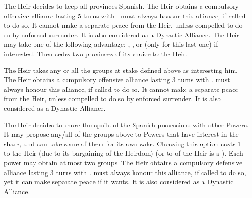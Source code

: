 \begin{digressions}
  \bgroup{}


  \aparag The Heir decides to keep all provinces Spanish.
  \aparag The Heir obtains a compulsory offensive alliance lasting 5 turns
  with \SPA. \SPA must always honour this alliance, if called to do so. It
  cannot make a separate peace from the Heir, unless compelled to do so by
  enforced surrender. It is also considered as a Dynastic Alliance.
  \aparag The Heir may take one of the following advantage: , ,  or  (\AUS only for this last one) if
  interested.
  \aparag Then \SPA cedes two provinces of its choice to the Heir.


  \aparag The Heir takes any or all the groups at stake defined above as
  interesting him.
  \aparag The Heir obtains a compulsory offensive alliance lasting 3 turns
  with \SPA. \SPA must always honour this alliance, if called to do so. It
  cannot make a separate peace from the Heir, unless compelled to do so by
  enforced surrender. It is also considered as a Dynastic Alliance.


  \aparag The Heir decides to share the spoils of the Spanish possessions with
  other Powers. It may propose any/all of the groups above to Powers that have
  interest in the share, and can take some of them for its own sake.
  \bparag Choosing this option costs 1 \STAB to the Heir (due to its
  bargaining of the Heirdom) (or to \SPA of the Heir is a \MIN).
  \bparag Each power may obtain at most two groups.
  \aparag The Heir obtains a compulsory defensive alliance lasting 3 turns
  with \SPA.  \SPA must always honour this alliance, if called to do so, yet
  it can make separate peace if it wants. It is also considered as a Dynastic
  Alliance.
  \egroup
\end{digressions}

